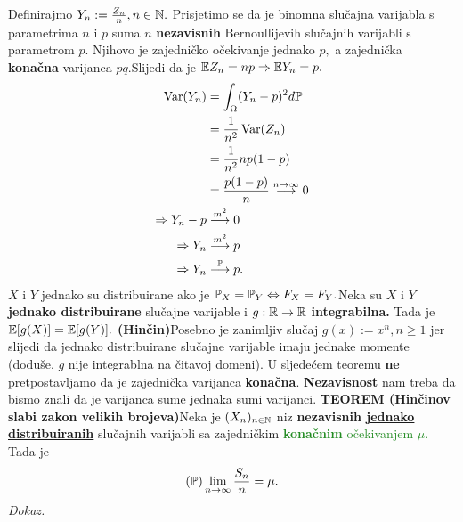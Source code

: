 \documentclass{article}
\newcommand{\Var}{\operatorname{Var}}
\begin{document}
Definirajmo \(Y_n:=\frac{Z_n}n,n\in\Bbb N.\) Prisjetimo se da je binomna slučajna varijabla s parametrima \(n\) i \(p\) suma \(n\) \textbf{nezavisnih} Bernoullijevih slučajnih varijabli s parametrom \(p.\) Njihovo je zajedničko očekivanje jednako \(p,\) a zajednička \textbf{konačna} varijanca \(pq.\)\newline Slijedi da je \(\Bbb EZ_n=np\Rightarrow\Bbb EY_n=p.\)  \[\begin{aligned}\Var (Y_n)&=\int_\Omega (Y_n-p)^2d\Bbb P\\&=\frac1{n^2}\Var (Z_n)\\&=\frac1{n^2}np(1-p)\\&=\frac{p(1-p)}n\overset{n\to\infty}{\longrightarrow}0\\\Rightarrow Y_n-p&\overset{m^2}{\longrightarrow}0\\\Rightarrow Y_n&\overset{m^2}{\longrightarrow}p\\\Rightarrow Y_n&\overset{\Bbb P}{\longrightarrow}p.\end{aligned}\] 
\(X\) i \(Y\) jednako su distribuirane ako je \(\Bbb P_X=\Bbb P_Y\Leftrightarrow F_X=F_Y.\)\newline\newline Neka su \(X\) i \(Y\) \textbf{jednako distribuirane} slučajne varijable i \(g:\Bbb R\to\Bbb R\) \textbf{integrabilna.} Tada je \(\Bbb E[g(X)]=\Bbb E[g(Y)].\)   \textbf{(Hinčin)}\newline Posebno je zanimljiv slučaj \(g(x):=x^n,n\ge 1\) jer slijedi da jednako distribuirane slučajne varijable imaju jednake momente (doduše, \(g\) nije integrablna na čitavoj domeni). \newline\newline U sljedećem teoremu \textbf{ne} pretpostavljamo da je zajednička varijanca \textbf{konačna}. \textbf{Nezavisnost} nam treba da bismo znali da je varijanca sume jednaka sumi varijanci.\newline 
\textbf{TEOREM (Hinčinov slabi zakon velikih brojeva)}\newline Neka je \((X_n)_{n\in\Bbb N}\) niz \textbf{nezavisnih \underline{jednako distribuiranih}} slučajnih varijabli sa zajedničkim \textcolor{ForestGreen}{\textbf{konačnim} očekivanjem \(\mu.\)} Tada je \[(\Bbb P)\lim_{n\to\infty}\frac{S_n}n=\mu.\] 
\textit{Dokaz.}\newline
\end{document}
